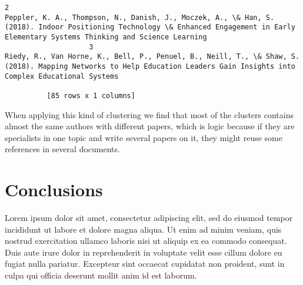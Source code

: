 \documentclass[journal,twocolumn]{IEEEtran}
\begin{document}
\begin{Verbatim}[commandchars=\\\{\}]
                    2                                                                                                                                                                                                                                         Peppler, K. A., Thompson, N., Danish, J., Moczek, A., \& Han, S. (2018). Indoor Positioning Technology \& Enhanced Engagement in Early Elementary Systems Thinking and Science Learning
                    3                                                                                                                                                                                                                                                      Riedy, R., Van Horne, K., Bell, P., Penuel, B., Neill, T., \& Shaw, S. (2018). Mapping Networks to Help Education Leaders Gain Insights into Complex Educational Systems 
          
          [85 rows x 1 columns]
\end{Verbatim}
            
    When applying this kind of clustering we find that most of the clusters
contains almost the same authors with different papers, which is logic
because if they are specialists in one topic and write several papers on
it, they might reuse some references in several documents.

    \section{Conclusions}\label{conclusions}

Lorem ipsum dolor sit amet, consectetur adipiscing elit, sed do eiusmod
tempor incididunt ut labore et dolore magna aliqua. Ut enim ad minim
veniam, quis nostrud exercitation ullamco laboris nisi ut aliquip ex ea
commodo consequat. Duis aute irure dolor in reprehenderit in voluptate
velit esse cillum dolore eu fugiat nulla pariatur. Excepteur sint
occaecat cupidatat non proident, sunt in culpa qui officia deserunt
mollit anim id est laborum.
\newpage

    
    



    
    
\end{document}
